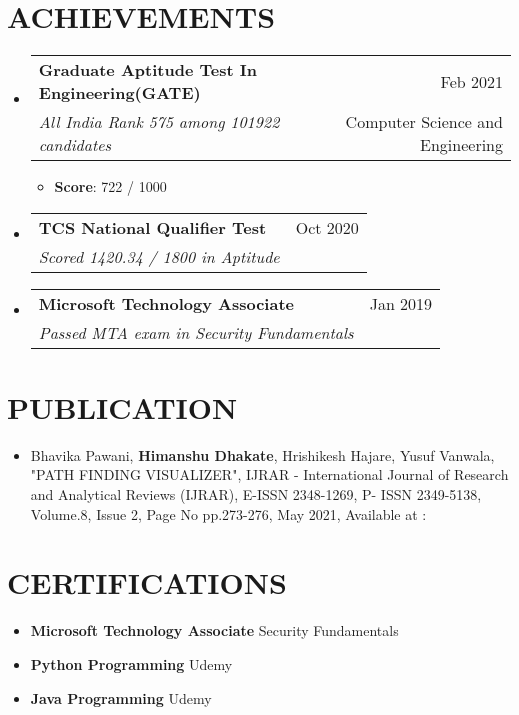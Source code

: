 \documentclass[letterpaper,11pt]{article}
\makeatletter
\newcommand{\myuline}[1]{%
  \uline{\phantom{#1}}%
  \llap{\contour{white}{#1}}%
}
\newcommand{\resumeItem}[1]{
  \item\small{
    {#1 \vspace{-1pt}}
  }
}
\newcommand{\resumeSubheading}[4]{
  \vspace{-1pt}\item
    \begin{tabular*}{\textwidth}[t]{l@{\extracolsep{\fill}}r}
      \textbf{#1} & {\color{dark-grey}\small #2}\vspace{1pt}\\ %
      \textit{#3} & {\color{dark-grey} \small #4}\\ %
    \end{tabular*}\vspace{-4pt}
}
\newcommand{\resumeSubHeadingListStart}{\begin{itemize}[leftmargin=0in, label={}]}
\newcommand{\resumeSubHeadingListEnd}{\end{itemize}}
\newcommand{\resumeItemListStart}{\begin{itemize}}
\newcommand{\resumeItemListEnd}{\end{itemize}\vspace{0pt}}
\makeatother
\begin{document}
\section {ACHIEVEMENTS}
  \resumeSubHeadingListStart
    \resumeSubheading
      {Graduate Aptitude Test In Engineering(GATE)}{Feb 2021}
      {All India Rank 575 among 101922 candidates}{Computer Science and Engineering}
	\resumeItemListStart
    	\resumeItem {\textbf{Score}: 722 / 1000}
       
        \resumeItemListEnd
    \resumeSubheading
      {TCS National Qualifier Test}{Oct 2020}
      {Scored 1420.34 / 1800 in Aptitude}{}
      	
	\resumeSubheading
      {Microsoft Technology Associate}{Jan 2019}
      {Passed MTA exam in Security Fundamentals}{}
      	
  \resumeSubHeadingListEnd

\section {PUBLICATION}
  \begin{itemize}
	\item Bhavika Pawani,  \textbf{Himanshu Dhakate},  Hrishikesh Hajare,  Yusuf Vanwala,   "PATH FINDING VISUALIZER", IJRAR - International Journal of Research and Analytical Reviews (IJRAR), E-ISSN 2348-1269, P- ISSN 2349-5138, Volume.8, Issue 2, Page No pp.273-276, May 2021, Available at : {\href{http://www.ijrar.org/IJRAR21B1503.pdf}{\myuline {link}}}
\end{itemize}
\section {CERTIFICATIONS}
 \begin{itemize}
	\item \textbf{Microsoft Technology Associate} Security Fundamentals
	\item \textbf{Python Programming} Udemy
	\item \textbf{Java Programming} Udemy
\end{itemize}
\end{document}
